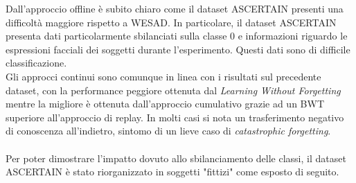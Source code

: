 Dall'approccio offline è subito chiaro come il dataset ASCERTAIN presenti una difficoltà maggiore rispetto a WESAD. In particolare, il dataset ASCERTAIN presenta dati particolarmente sbilanciati sulla classe 0 e informazioni riguardo le espressioni facciali dei soggetti durante l'esperimento. Questi dati sono di difficile classificazione.\\
Gli approcci continui sono comunque in linea con i risultati sul precedente dataset, con la performance peggiore ottenuta dal \textit{Learning Without Forgetting} mentre la migliore è ottenuta dall'approccio cumulativo grazie ad un BWT superiore all'approccio di replay. In molti casi si nota un trasferimento negativo di conoscenza all'indietro, sintomo di un lieve caso di \textit{catastrophic forgetting}.\\\\
Per poter dimostrare l'impatto dovuto allo sbilanciamento delle classi, il dataset ASCERTAIN è stato riorganizzato in soggetti "fittizi" come esposto di seguito.
\pagebreak
